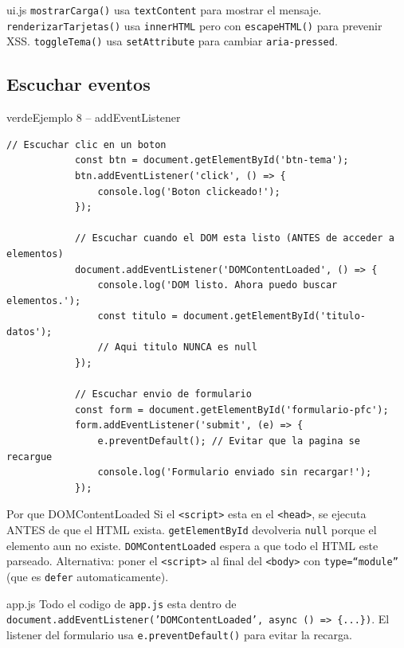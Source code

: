 \documentclass[11pt,a4paper]{article}
\begin{document}
	\begin{cajapractica}{ui.js}
		\texttt{mostrarCarga()} usa \texttt{textContent} para mostrar el mensaje. \texttt{renderizarTarjetas()} usa \texttt{innerHTML} pero con \texttt{escapeHTML()} para prevenir XSS. \texttt{toggleTema()} usa \texttt{setAttribute} para cambiar \texttt{aria-pressed}.
	\end{cajapractica}
	
	\subsection{Escuchar eventos}
	
	\begin{cajacodigo}{verde}{Ejemplo 8 -- addEventListener}
		\begin{lstlisting}[style=codejs]
			// Escuchar clic en un boton
			const btn = document.getElementById('btn-tema');
			btn.addEventListener('click', () => {
				console.log('Boton clickeado!');
			});
			
			// Escuchar cuando el DOM esta listo (ANTES de acceder a elementos)
			document.addEventListener('DOMContentLoaded', () => {
				console.log('DOM listo. Ahora puedo buscar elementos.');
				const titulo = document.getElementById('titulo-datos');
				// Aqui titulo NUNCA es null
			});
			
			// Escuchar envio de formulario
			const form = document.getElementById('formulario-pfc');
			form.addEventListener('submit', (e) => {
				e.preventDefault(); // Evitar que la pagina se recargue
				console.log('Formulario enviado sin recargar!');
			});
		\end{lstlisting}
	\end{cajacodigo}
	
	\begin{cajaconcepto}{Por que DOMContentLoaded}
		Si el \texttt{<script>} esta en el \texttt{<head>}, se ejecuta ANTES de que el HTML exista. \texttt{getElementById} devolveria \texttt{null} porque el elemento aun no existe. \texttt{DOMContentLoaded} espera a que todo el HTML este parseado. Alternativa: poner el \texttt{<script>} al final del \texttt{<body>} con \texttt{type=``module''} (que es \texttt{defer} automaticamente).
	\end{cajaconcepto}
	
	\begin{cajapractica}{app.js}
		Todo el codigo de \texttt{app.js} esta dentro de \texttt{document.addEventListener('DOMContentLoaded', async () => \{...\})}. El listener del formulario usa \texttt{e.preventDefault()} para evitar la recarga.
	\end{cajapractica}
	
\end{document}

